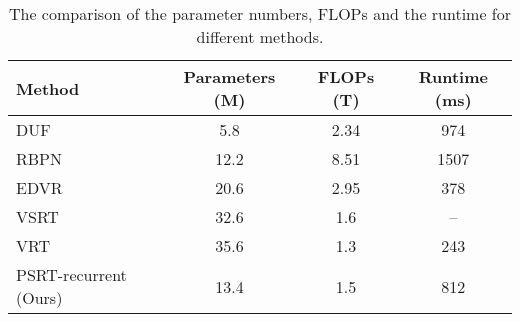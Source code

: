 \documentclass{article}
\begin{document}
\begin{table}[t]
    \caption{The comparison of the parameter numbers, FLOPs and the runtime for different methods.}
    \label{tab:flops}
    \vspace{1mm}
    \centering
    \begin{tabular}{l|c|c|c}
    \toprule
        Method & Parameters (M) & FLOPs (T) & Runtime (ms) \\
    \midrule
        DUF & 5.8 & 2.34 & 974 \\
        RBPN & 12.2 & 8.51 & 1507 \\
        EDVR \cite{wang2019edvr} & 20.6 & 2.95 & 378 \\
        VSRT \cite{cao2021video} & 32.6 & 1.6 & --\\
        VRT \cite{liang2022vrt} & 35.6 & 1.3 & 243\\
        PSRT-recurrent (Ours) & 13.4 & 1.5 & 812\\
    \bottomrule
    \end{tabular}
    \vspace{-4mm}
\end{table}
\end{document}
